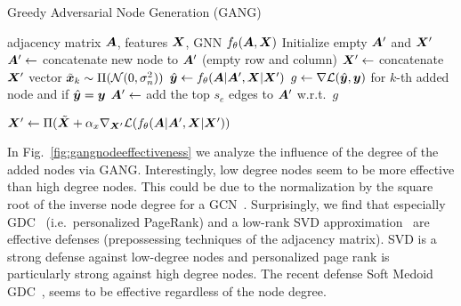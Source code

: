 \documentclass[letterpaper]{article} %
\newcommand{\adj}{\mA}
\newcommand{\features}{\mX}
\begin{document}
\begin{algorithm}[t]
    \small
	\caption{Greedy Adversarial Node Generation (GANG)}
	\label{algo:gang}
	\begin{algorithmic}[1]
		 adjacency matrix \(\adj\), features \(\features\), GNN \(f_{\theta}(\adj, \features)\)
		\STATE Initialize empty \(\adj^\prime\) and \(\features^\prime\)
		\STATE \(\adj^\prime \leftarrow\) concatenate new node to \(\adj^\prime\) (empty row and column)
		\STATE \(\features^\prime \leftarrow\) concatenate \(\features^\prime\) vector \(\tilde{{\bm{x}}}_k \sim \Pi(\mathcal{N}(0, \sigma_n^2))\)
		\STATE \(\hat{\vy} \leftarrow f_{\theta}(\adj | \adj^\prime, \features | \features^\prime)\)
		\STATE \(g \leftarrow \nabla \mathcal{L}(\hat{{\bm{y}}}, {\bm{y}})\) for \(k\)-th added node and if \(\hat{{\bm{y}}} = {\bm{y}}\)
		\STATE \(\adj^\prime \leftarrow\) add the top \(s_e\) edges to \(\adj^\prime\) w.r.t.~\(g\)
		\ENDFOR
						
						
		\STATE \(\features^\prime \leftarrow \Pi(\tilde{\features} + \alpha_x \nabla_{\features^\prime} \mathcal{L}(f_{\theta}(\adj | \adj^\prime, \features | \features^\prime))\)
		\ENDFOR
		\ENDFOR
	\end{algorithmic}
\end{algorithm}

In Fig.~\ref{fig:gangnodeeffectiveness} we analyze the influence of the degree of the added nodes via GANG. Interestingly, low degree nodes seem to be more effective than high degree nodes. This could be due to the normalization by the square root of the inverse node degree for a GCN~\cite{Kipf2017}. Surprisingly, we find that especially GDC~\cite{Klicpera2019a} (i.e.~personalized PageRank) and a low-rank SVD approximation~\cite{Entezari2020} are effective defenses (prepossessing techniques of the adjacency matrix). SVD is a strong defense against low-degree nodes and personalized page rank is particularly strong against high degree nodes. The recent defense Soft Medoid GDC~\citep{Geisler2020}, seems to be effective regardless of the node degree.
\end{document}
